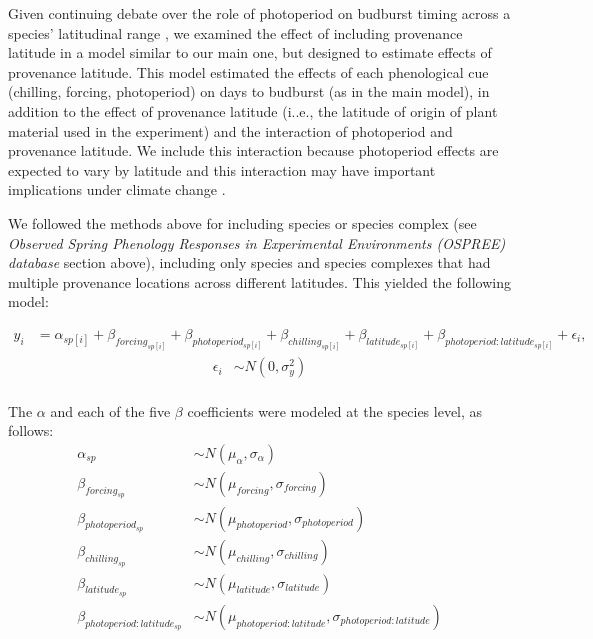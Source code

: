 \documentclass{article}
\begin{document}
\begin{enumerate}
Given continuing debate over the role of photoperiod on budburst timing across a species' latitudinal range  \emph{\citep[e.g.,][]{zohner2016,gauzere2017}}, we examined the effect of including provenance latitude in a model similar to our main one, but designed to estimate effects of provenance latitude. This model estimated the effects of each phenological cue (chilling, forcing, photoperiod) on days to budburst (as in the main model), in addition to the effect of provenance latitude (i..e., the latitude of origin of plant material used in the experiment) and the interaction of photoperiod and provenance latitude. We include this interaction because photoperiod effects are expected to vary by latitude and this interaction may have important implications under climate change \emph{\citep{gauzere2017,saikkonen2012,way2015}}.
\par We followed the methods above for including species or species complex (see \emph{Observed Spring Phenology Responses in Experimental Environments (OSPREE) database} section above), including only species and species complexes that had multiple provenance locations across different latitudes. This yielded the following model:

\begin{align*}
y_i &= \alpha_{sp[i]} + \beta_{forcing_{sp[i]}} + \beta_{photoperiod_{sp[i]}} + \beta_{chilling_{sp[i]}} + \beta_{latitude_{sp[i]}} + \beta_{photoperiod : latitude_{sp[i]}} + \epsilon_i,
\end{align*}
\begin{align*}
\epsilon_i & \sim N(0,\sigma^2_y) \\
\end{align*}

\noindent The $\alpha$ and each of the five $\beta$ coefficients were modeled at the species level, as follows:
\begin{align*}
\alpha_{sp} & \sim N(\mu_{\alpha}, \sigma_{\alpha}) \\
\beta_{forcing_{sp}} & \sim N(\mu_{forcing}, \sigma_{forcing}) \\
\beta_{photoperiod_{sp}} & \sim N(\mu_{photoperiod}, \sigma_{photoperiod})\\
\beta_{chilling_{sp}} & \sim N(\mu_{chilling}, \sigma_{chilling})\\
\beta_{latitude_{sp}} & \sim N(\mu_{latitude}, \sigma_{latitude})\\
\beta_{photoperiod : latitude_{sp}} & \sim N(\mu_{photoperiod : latitude}, \sigma_{photoperiod : latitude})
\end{align*}


\end{enumerate}
\end{document}
